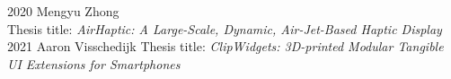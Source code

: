 
      \begin{cvreviews}
        \cvreview
          {2020}
          {Mengyu Zhong\\
          Thesis title: \emph{AirHaptic: A Large-Scale, Dynamic, Air-Jet-Based Haptic Display}}
        \cvreview
          {2021}
          {Aaron Visschedijk}
          Thesis title: \emph{ClipWidgets: 3D-printed Modular Tangible UI Extensions for Smartphones}
      \end{cvreviews}